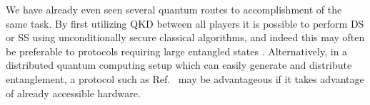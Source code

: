 We have already even seen several quantum routes to accomplishment of the same task. By first utilizing QKD between all players it is possible to perform DS  or SS  using unconditionally secure classical algorithms, and indeed this may often be preferable to protocols requiring large entangled states . Alternatively, in a distributed quantum computing setup which can easily generate and distribute entanglement, a protocol such as Ref.~ may be advantageous if it takes advantage of already accessible hardware. 




